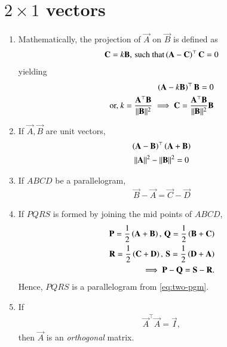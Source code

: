 \section{$2\times 1$ vectors}

\begin{enumerate}[label=\thesection.\arabic*.,ref=\thesection.\theenumi]
	\item Mathematically, 
the projection of $\vec{A}$ on $\vec{B}$ is defined as
		\begin{align}
	\mathbf{C} = k \mathbf{B},\, \text{such that}
	\left(\mathbf{A}-\mathbf{C}\right)^{\top}\mathbf{C} = 0
\end{align}
yielding
\begin{align}
	\left(\mathbf{A}-k\mathbf{B}\right)^{\top}\mathbf{B} = 0
	\\
	\text{or, } k = 
	\frac{\mathbf{A}^{\top}\mathbf{B}}{\lVert\mathbf{B}\rVert^2}
	\implies 
	\mathbf{C} = 
	\frac{\mathbf{A}^{\top}\mathbf{B}}{\lVert\mathbf{B}\rVert^2}
 \mathbf{B}
	\label{eq:12/10/3/4/proj}
\end{align}
\item If $\vec{A}, \vec{B}$ are unit vectors, 
\begin{multline}
	\left(\mathbf{A}-\mathbf{B}\right)^{\top} 
	\left(\mathbf{A}+\mathbf{B}\right) 
	\\
\lVert\mathbf{A}\rVert^2 - \lVert\mathbf{B}\rVert^2
	= 0
	\label{eq:12/10/3/11/unit}
\end{multline}
  \item If $ABCD$ be a parallelogram,
	  \label{prop:two-pgm}
  \begin{align}
	  \label{eq:two-pgm}
 \vec{B}-\vec{A} = \vec{C} -\vec{D}
  \end{align}
  \item 
If $PQRS$ is formed by joining the mid points of $ABCD$, 
\begin{align}
  \mathbf{P} = \frac{1}{2}\left(\mathbf{A}+\mathbf{B}\right) 
  ,\,
 \mathbf{Q} = \frac{1}{2}\left(\mathbf{B}+\mathbf{C}\right) 
 \\
 \mathbf{R} = \frac{1}{2}\left(\mathbf{C}+\mathbf{D}\right)   
  ,\,
 \mathbf{S} = \frac{1}{2}\left(\mathbf{D}+\mathbf{A}\right)  
 \\
	\implies 
 \mathbf{P}-\mathbf{Q} = \mathbf{S} -\mathbf{R}.
  \label{eq:10/7/4/8det2f}
\end{align}
Hence, $PQRS$ is a parallelogram
	  from \eqref{eq:two-pgm}.
  \item If 
\begin{align}
	\vec{A}^{\top}\vec{A} =\vec{I},
\label{eq:12/10/3/5/inner}
\end{align}
		then $	\vec{A}$ is an {\em orthogonal} matrix.
\end{enumerate}
\iffalse

